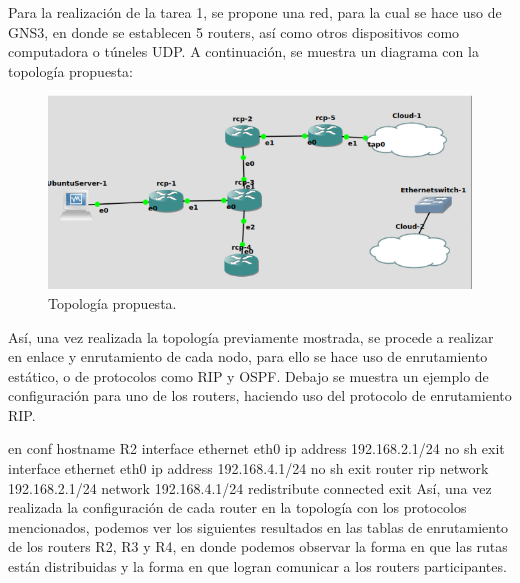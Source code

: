 \noindent
Para la realización de la tarea 1, se propone una red, para la cual se hace uso de GNS3, en donde se establecen 5 routers, así como otros dispositivos como computadora o túneles UDP.
\newline
A continuación, se muestra un diagrama con la topología propuesta:

\begin{figure}[htbp!]
	\centering
	\includegraphics[width=1\textwidth]{desarrollo/tarea1/img/T1_img1}
	\caption{Topología propuesta.}
\end{figure}

\noindent
Así, una vez realizada la topología previamente mostrada, se procede a realizar en enlace y enrutamiento de cada nodo, para ello se hace uso de enrutamiento estático, o de protocolos como RIP y OSPF. Debajo se muestra un ejemplo de configuración para uno de los routers, haciendo uso del protocolo de enrutamiento RIP.
\newline

\noindent
en
\newline
conf
\newline
hostname R2
\newline
interface ethernet eth0
\newline
ip address 192.168.2.1/24
\newline
no sh
\newline
exit
\newline
interface ethernet eth0
\newline
ip address 192.168.4.1/24
\newline
no sh
\newline
exit
\newline
router rip
\newline
network 192.168.2.1/24
\newline
network 192.168.4.1/24
\newline
redistribute connected
\newline
exit
\newline
\newline
Así, una vez realizada la configuración de cada router en la topología con los protocolos mencionados, podemos ver los siguientes resultados en las tablas de enrutamiento de los routers R2, R3 y R4, en donde podemos observar la forma en que las rutas están distribuidas y la forma en que logran comunicar a los routers participantes. 

